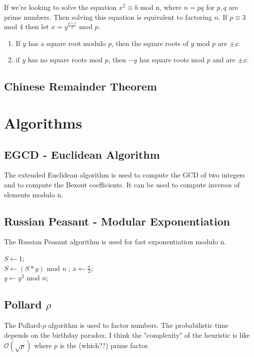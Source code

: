 \documentclass[12pt,a4paper]{article}
\begin{document}
If we're looking to solve the equation $x^{2} \equiv b$ mod n, where $n = pq$ for $p, q$ are prime numbers. Then solving this equation is equivalent to factoring $n$. If $p \equiv 3$ mod $4$ then let $x = y^{\frac{p+1}{4}}$ mod $p$. 
\begin{enumerate}
	\item If $y$ has a square root modulo $p$, then the square roots of $y$ mod $p$ are $\pm x$. 
	\item if $y$ has no square roots mod $p$, then $-y$ has square roots mod $p$ and are $\pm x$. 
\end{enumerate}




\subsection{Chinese Remainder Theorem}


\section{Algorithms}

\subsection{EGCD - Euclidean Algorithm}
The extended Euclidean algorithm is used to compute the GCD of two integers and to compute the Bezout coefficients. It can be used to compute inverses of elements modulo n. 

\subsection{Russian Peasant - Modular Exponentiation}
The Russian Peasant algorithm is used for fast exponentiation modulo n.


\begin{algorithm}[H]
	$S \gets 1$;\\
	 {
		 {$S \gets \left(S * y \right) \text{ mod } n\;$;}
		$x \gets \frac{x}{2}$; \\
		$y \gets y^{2} \text{ mod } n$;
	}
\end{algorithm}
\subsection{Pollard $\rho$}
The Pollard-$\rho$ algorithm is used to factor numbers. The probabilistic time depends on the birthday paradox. I think the "complexity" of the heuristic is like $\mathcal{O}(\sqrt{p})$ where $p$ is the (which??) prime factor.  
\end{document}
